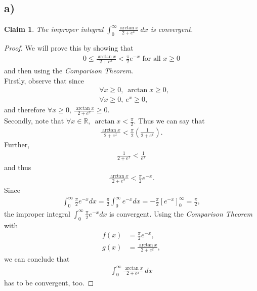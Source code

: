 \documentclass{article}
\newcommand{\R}{\mathbb{R}}
\newtheorem{claim}[section]{Claim}
\begin{document}
\subsection*{a)}
\begin{claim}
  The improper integral $\int_0^{\infty}\frac{\arctan x}{2+e^x}\:dx$ is convergent.
\end{claim}
\begin{proof}
  We will prove this by showing that
  \begin{align*}
    0\leq \frac{\arctan x}{2+e^x} < \frac{\pi}{2}e^{-x} \text{ for all } x \geq 0
  \end{align*}
  and then using the \emph{Comparison Theorem}.\\
  Firstly, observe that since
  \begin{align*}
    &\forall x \geq 0,\: \arctan x \geq 0,\\
    &\forall x \geq 0,\: e^x \geq 0,
  \end{align*} 
  and therefore $\forall x \geq 0,\: \frac{\arctan x}{2+e^x}\geq 0$.\\
  Secondly, note that $\forall x \in \R,\: \arctan x < \frac{\pi}{2}$. Thus we can say that
  \begin{align*}
    \frac{\arctan x}{2+e^x}<\frac{\pi}{2}\left(\frac{1}{2+e^x}\right).
  \end{align*}
  Further, 
  \begin{align*}
    \frac{1}{2+e^x}<\frac{1}{e^x}
  \end{align*} 
  and thus
  \begin{align*}
    \frac{\arctan x}{2+e^x}<\frac{\pi}{2}e^{-x}.
  \end{align*}
  Since
  \begin{align*}
    \int_0^\infty \frac{\pi}{2}e^{-x}dx = \frac{\pi}{2}\int_0^\infty e^{-x}dx = -\frac{\pi}{2}\left[e^{-x}\right]^\infty_0=\frac{\pi}{2},
  \end{align*}
  the improper integral $\int_0^\infty \frac{\pi}{2}e^{-x}dx$ is convergent. Using the \emph{Comparison Theorem} with 
  \begin{align*}
    f(x)&=\frac{\pi}{2}e^{-x},\\
    g(x)&=\frac{\arctan x}{2+e^x},
  \end{align*}
  we can conclude that
  \begin{align*}
    \int_0^\infty \frac{\arctan x}{2+e^x}\:dx
  \end{align*}
  has to be convergent, too.
\end{proof}
\end{document}
